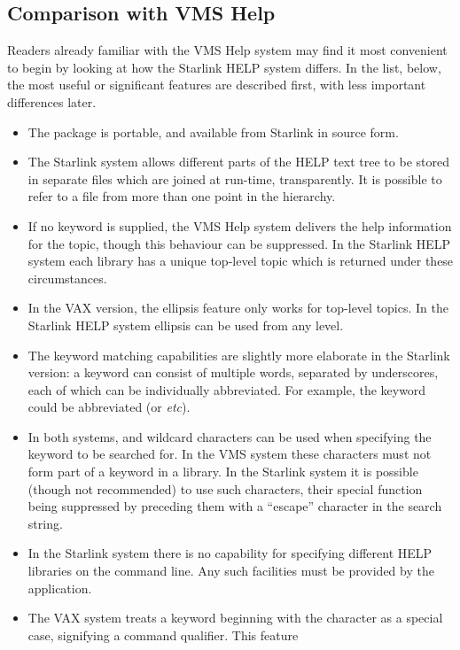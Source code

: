\subsection{Comparison with VMS Help}
Readers already familiar with the VMS Help system may find it
most convenient to begin by looking at how the Starlink HELP
system differs.  In the
list, below, the most useful or significant features are
described first, with less important differences later.
\begin{itemize}
\item The package is portable, and available from Starlink in
source form.
\item The Starlink system allows different parts of the HELP text
tree to be stored in separate files which are joined
at run-time, transparently.  It is possible to refer to a file
from more than one point in the hierarchy.
\item If no keyword is supplied, the VMS Help system delivers
the help information for the  topic, though this
behaviour can be suppressed.  In the Starlink HELP
system each library has a unique top-level topic which is
returned under these circumstances.
\item In the VAX version, the  ellipsis feature
only works for top-level topics.  In the Starlink HELP system
ellipsis can be used from any level.
\item The keyword matching capabilities are slightly more
elaborate in the Starlink version: a keyword can consist
of multiple words, separated by
underscores, each of which can be individually abbreviated.
For example, the keyword  could
be abbreviated  (or  {\it etc}).  
\item In both systems, \fstring{\%} and \fstring{*}
wildcard characters can be used
when specifying the keyword to be searched for.  In the VMS system
these characters
must not form part of a keyword in a library.  In the Starlink
system it is possible (though not recommended) to use such
characters, their special function being
suppressed by preceding them with a \fstring{$\backslash$}
``escape'' character in the search string.
\item In the Starlink system there is no capability for specifying
different HELP libraries on the command line.  Any such facilities
must be provided by the application.
\item The VAX system treats a keyword beginning with the character
\fstring{/} as a special case, signifying a command qualifier.  This feature

\end{itemize}
